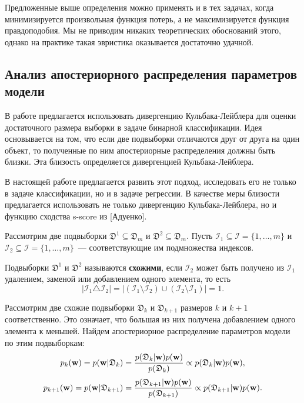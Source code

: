 Предложенные выше определения можно применять и в тех задачах, когда минимизируется произвольная функция потерь, а не максимизируется функция правдоподобия. Мы не приводим никаких теоретических обоснований этого, однако на практике такая эвристика оказывается достаточно удачной.

\subsection{Анализ апостериорного распределения параметров модели}

В работе \citep{MOTRENKO2014743} предлагается использовать дивергенцию Кульбака-Лейблера для оценки достаточного размера выборки в задаче бинарной классификации. Идея основывается на том, что если две подвыборки отличаются друг от друга на один объект, то полученные по ним апостериорные распределения должны быть близки. Эта близость определяется дивергенцией Кульбака-Лейблера. 

В настоящей работе предлагается развить этот подход, исследовать его не только в задаче классификации, но и в задаче регрессии. В качестве меры близости предлагается использовать не только дивергенцию Кульбака-Лейблера, но и функцию сходства s-score из [Адуенко].

Рассмотрим две подвыборки $\mathfrak{D}^1 \subseteq \mathfrak{D}_m$ и $\mathfrak{D}^2 \subseteq \mathfrak{D}_m$. Пусть $\mathcal{I}_1 \subseteq \mathcal{I} = \{ 1, \ldots, m \}$ и $\mathcal{I}_2 \subseteq \mathcal{I} = \{ 1, \ldots, m \}$~--- соответствующие им подмножества индексов.

\begin{definition}
    Подвыборки $\mathfrak{D}^1$ и $\mathfrak{D}^2$ называются \textbf{схожими}, если $\mathcal{I}_2$ может быть получено из $\mathcal{I}_1$ удалением, заменой или добавлением одного элемента, то есть $$ \left| \mathcal{I}_1 \triangle \mathcal{I}_2 \right| = \left| \left( \mathcal{I}_1 \setminus \mathcal{I}_2 \right) \cup \left( \mathcal{I}_2 \setminus \mathcal{I}_1 \right) \right| = 1. $$
\end{definition}

Рассмотрим две схожие подвыборки $\mathfrak{D}_k$ и $\mathfrak{D}_{k+1}$ размеров $k$ и $k+1$ соответственно. Это означает, что большая из них получена добавлением одного элемента к меньшей. Найдем апостериорное распределение параметров модели по этим подвыборкам:
\[ p_k(\mathbf{w}) = p(\mathbf{w} | \mathfrak{D}_k) = \dfrac{p(\mathfrak{D}_k | \mathbf{w}) p(\mathbf{w})}{p(\mathfrak{D}_k)} \propto p(\mathfrak{D}_k | \mathbf{w}) p(\mathbf{w}), \]
\[ p_{k+1}(\mathbf{w}) = p(\mathbf{w} | \mathfrak{D}_{k+1}) = \dfrac{p(\mathfrak{D}_{k+1} | \mathbf{w}) p(\mathbf{w})}{p(\mathfrak{D}_{k+1})} \propto p(\mathfrak{D}_{k+1} | \mathbf{w}) p(\mathbf{w}). \]

